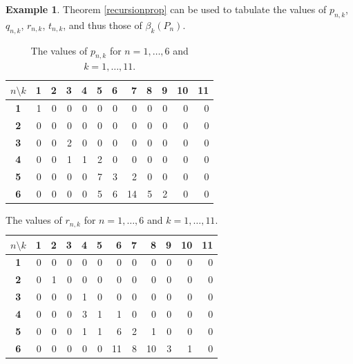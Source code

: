 \documentclass[12pt]{amsart}
\theoremstyle{definition}
\newtheorem{example}[theorem]{Example}
\begin{document}
\begin{example}
Theorem \ref{recursionprop} can be used to tabulate the values of $p_{n,k}$, $q_{n,k}$, $r_{n,k}$, $t_{n,k}$, and thus those of $\beta_k(P_n)$.

\begin{table}[H]
    \centering
    \label{tab:pnk_values}
    \setlength{\tabcolsep}{6pt}
    \renewcommand{\arraystretch}{1.2}
    \begin{tabular}{c|rrrrrrrrrrr}
        \toprule
        \boldmath$n \setminus k$ & \textbf{1} & \textbf{2} & \textbf{3} & \textbf{4} & \textbf{5} & \textbf{6} & \textbf{7} & \textbf{8} & \textbf{9} & \textbf{10} & \textbf{11} \\
        \midrule
        \textbf{1} & 1 & 0 & 0 & 0 & 0 & 0 & 0 & 0 & 0 & 0 & 0 \\
        \textbf{2} & 0 & 0 & 0 & 0 & 0 & 0 & 0 & 0 & 0 & 0 & 0 \\
        \textbf{3} & 0 & 0 & 2 & 0 & 0 & 0 & 0 & 0 & 0 & 0 & 0 \\
        \textbf{4} & 0 & 0 & 1 & 1 & 2 & 0 & 0 & 0 & 0 & 0 & 0 \\
        \textbf{5} & 0 & 0 & 0 & 0 & 7 & 3 & 2 & 0 & 0 & 0 & 0 \\
        \textbf{6} & 0 & 0 & 0 & 0 & 5 & 6 & 14 & 5 & 2 & 0 & 0 \\
        \bottomrule
    \end{tabular}
    \caption{The values of $p_{n,k}$ for $n=1,\ldots,6$ and $k=1,\ldots,11$.}
\end{table}

\begin{table}[H]
    \centering
    \label{tab:rnk_values}
    \setlength{\tabcolsep}{6pt}
    \renewcommand{\arraystretch}{1.2}
    \begin{tabular}{c|rrrrrrrrrrr}
        \toprule
        \boldmath$n \setminus k$ & \textbf{1} & \textbf{2} & \textbf{3} & \textbf{4} & \textbf{5} & \textbf{6} & \textbf{7} & \textbf{8} & \textbf{9} & \textbf{10} & \textbf{11} \\
        \midrule
        \textbf{1} & 0 & 0 & 0 & 0 & 0 & 0 & 0 & 0 & 0 & 0 & 0 \\
        \textbf{2} & 0 & 1 & 0 & 0 & 0 & 0 & 0 & 0 & 0 & 0 & 0 \\
        \textbf{3} & 0 & 0 & 0 & 1 & 0 & 0 & 0 & 0 & 0 & 0 & 0 \\
        \textbf{4} & 0 & 0 & 0 & 3 & 1 & 1 & 0 & 0 & 0 & 0 & 0 \\
        \textbf{5} & 0 & 0 & 0 & 1 & 1 & 6 & 2 & 1 & 0 & 0 & 0 \\
        \textbf{6} & 0 & 0 & 0 & 0 & 0 & 11 & 8 & 10 & 3 & 1 & 0 \\
        \bottomrule
    \end{tabular}
    \caption{The values of $r_{n,k}$ for $n=1,\ldots,6$ and $k=1,\ldots,11$.}
\end{table}


\end{example}
\end{document}
